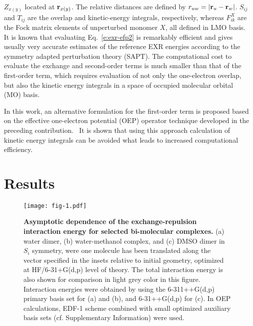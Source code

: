 $Z_{x(y)}$ located at ${\bf r}_{x(y)}$. The relative distances are
defined by $r_{uw}=\vert {\bf r}_u-{\bf r}_w\vert$.
$S_{ij}$ and $T_{ij}$ are the overlap and kinetic\hyp{}energy
integrals, respectively, whereas $F_{ik}^X$ are the Fock matrix elements
of unperturbed monomer $X$, all defined in LMO basis.
It is known that evaluating Eq.~\eqref{e:exr-efp2}
is remarkably efficient and gives usually very accurate
estimates of the reference EXR energies according to the symmetry 
adapted perturbation theory\cite{Jeziorski.Moszynski.Szalewicz.ChemRev.1994} (SAPT).
The computational cost to evaluate
the exchange and second\hyp{}order terms
is much smaller than that of the first\hyp{}order term,
which requires evaluation of not only the one\hyp{}electron overlap,
but also the kinetic
energy integrals in a space of occupied molecular orbital (MO) basis.

In this work, an alternative formulation for the first\hyp{}order
term is proposed based on the effective one\hyp{}electron potential (OEP)
operator technique developed in the preceding contribution.~\cite{Blasiak.Bednarska.Choluj.Bartkowiak.JCP.2019}
It is shown that using this approach calculation of kinetic energy integrals can be avoided
what leads to increased computational efficiency.

\section{Results}

%
\begin{figure}[t]
\texttt{[image: fig-1.pdf]}
\caption{\label{f:fig-1} {\bf Asymptotic dependence of the exchange\hyp{}repulsion interaction energy
for selected bi\hyp{}molecular complexes.} 
(a) water dimer, 
(b) water\hyp{}methanol complex, and 
(c) DMSO dimer in $S_i$ symmetry,
were one molecule has been translated
along the vector specified in the insets relative to initial geometry,
optimized at HF/6-31+G(d,p) level of theory.
The 
total interaction energy
is also shown for comparison in light grey color in this figure.
Interaction energies were obtained by using the 6-311++G(d,p)
primary basis set for (a) and (b), and 6-31++G(d,p) for (c).
In OEP calculations, EDF-1 scheme combined with small optimized auxiliary basis sets
(cf. Supplementary Information) were used.
} 
\end{figure}
%

